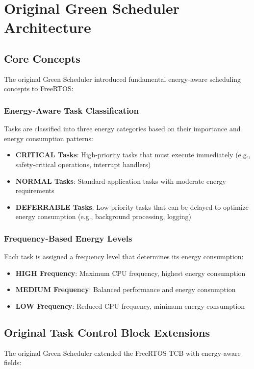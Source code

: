 \documentclass[11pt,a4paper]{article}
\begin{document}
\section{Original Green Scheduler Architecture}

\subsection{Core Concepts}
The original Green Scheduler introduced fundamental energy-aware scheduling concepts to FreeRTOS:

\subsubsection{Energy-Aware Task Classification}
Tasks are classified into three energy categories based on their importance and energy consumption patterns:

\begin{itemize}
    \item \textbf{CRITICAL Tasks}: High-priority tasks that must execute immediately (e.g., safety-critical operations, interrupt handlers)
    \item \textbf{NORMAL Tasks}: Standard application tasks with moderate energy requirements
    \item \textbf{DEFERRABLE Tasks}: Low-priority tasks that can be delayed to optimize energy consumption (e.g., background processing, logging)
\end{itemize}

\subsubsection{Frequency-Based Energy Levels}
Each task is assigned a frequency level that determines its energy consumption:
\begin{itemize}
    \item \textbf{HIGH Frequency}: Maximum CPU frequency, highest energy consumption
    \item \textbf{MEDIUM Frequency}: Balanced performance and energy consumption  
    \item \textbf{LOW Frequency}: Reduced CPU frequency, minimum energy consumption
\end{itemize}

\subsection{Original Task Control Block Extensions}
The original Green Scheduler extended the FreeRTOS TCB with energy-aware fields:
\end{document}
